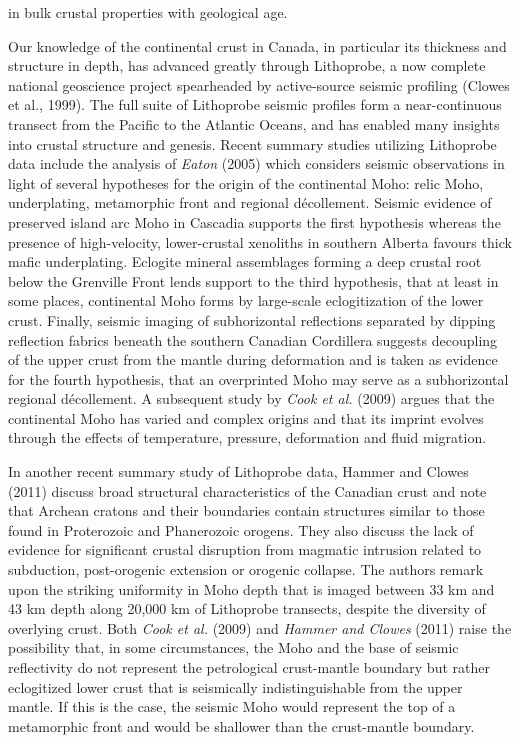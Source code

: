 \documentclass[review]{elsarticle}
\begin{document}
in bulk crustal properties with geological age.

Our knowledge of the continental crust in Canada, in particular its thickness and structure in depth, has advanced greatly through Lithoprobe, a now complete national geoscience project spearheaded by active-source seismic profiling (Clowes et al., 1999). The full suite of Lithoprobe seismic profiles form a near-continuous transect from the Pacific to the Atlantic Oceans, and has enabled many insights into crustal structure and genesis. Recent summary studies utilizing Lithoprobe data include the analysis of {\it Eaton} (2005) which considers seismic observations in light of several hypotheses for the origin of the continental Moho: relic Moho, underplating, metamorphic front and regional d\'{e}collement. Seismic evidence of preserved island arc Moho in Cascadia supports the first hypothesis whereas the presence of high-velocity, lower-crustal xenoliths in southern Alberta favours thick mafic underplating. Eclogite mineral assemblages forming a deep crustal root below the Grenville Front lends support to the third hypothesis, that at least in some places, continental Moho forms by large-scale eclogitization of the lower crust. Finally, seismic imaging of subhorizontal reflections separated by dipping reflection fabrics beneath the southern Canadian Cordillera suggests decoupling of the upper crust from the mantle during deformation and is taken as evidence for the fourth hypothesis, that an overprinted Moho may serve as a subhorizontal regional d\'ecollement. A subsequent study by {\it Cook et al.} (2009) argues that the continental Moho has varied and complex origins and that its imprint evolves through the effects of temperature, pressure, deformation and fluid migration.

In another recent summary study of Lithoprobe data, Hammer and Clowes (2011) discuss broad structural characteristics of the Canadian crust and note that Archean cratons and their boundaries contain structures similar to those found in Proterozoic and Phanerozoic orogens. They also discuss the lack of evidence for significant crustal disruption from magmatic intrusion related to subduction, post-orogenic extension or orogenic collapse. The authors remark upon the striking uniformity in Moho depth that is imaged between 33 km and 43 km depth along 20,000 km of Lithoprobe transects, despite the diversity of overlying crust. Both {\it Cook et al.} (2009) and {\it Hammer and Clowes} (2011) raise the possibility that, in some circumstances, the Moho and the base of seismic reflectivity do not represent the petrological crust-mantle boundary but rather eclogitized lower crust that is seismically indistinguishable from the upper mantle. If this is the case, the seismic Moho would represent the top of a metamorphic front and would be shallower than the crust-mantle boundary.
\end{document}
